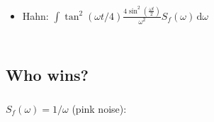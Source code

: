 \documentclass[aspectratio=169, 13pt, t]{beamer}
\newcommand{\diff}{\,\mathrm{d}}
\begin{document}
\begin{frame}[t]
\begin{columns}[c]
\vspace{0.1cm}
\begin{itemize}

\item Hahn: $\int \tan^2(\omega t/4) \frac{4 \sin^2(\frac{\omega t}{2})}{\omega^2} S_f(\omega)\diff \omega  $ 

\end{itemize}
\end{columns}

\end{frame}

\subsection{Who wins?}

\begin{frame}[t]\frametitle{\secname}\framesubtitle{\subsecname}
$S_f(\omega) =1/\omega$ (pink noise):
\end{frame}
\end{document}
